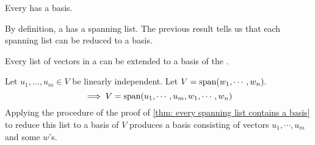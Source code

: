 \setcounter{thm}{30}
\begin{thm}  
  \label{thm: every finite-dimensional vector space has a basis}
  Every \findimvs has a basis.
\end{thm}
\begin{prf}
  By definition, a \fdvs has a spanning list. The previous result tells us that each spanning list can be reduced to a basis. 
\end{prf}

\begin{thm} 
  \label{thm: every linearly independent list of vectors in a finite-dimensional vector space can be extended to a basis of the vector space}
  Every \lid list of vectors in a  \findimvs can be extended to a basis of the \vs. 
\end{thm}
\begin{prf}
  Let $u_1, \ldots, u_m \in V$ be linearly independent. Let $V=\operatorname{span} (w_1, \cdots, w_n).$
  \begin{equation}
    \implies V=\operatorname{span} (u_1, \cdots, u_m, w_1, \cdots, w_n )
  \end{equation}
  Applying the procedure of the proof of \ref{thm: every spanning list contains a basis} to reduce this list to a basis of $V$ produces a basis consisting of vectors $u_1, \cdots, u_m$ and some $w$'s.
\end{prf}

